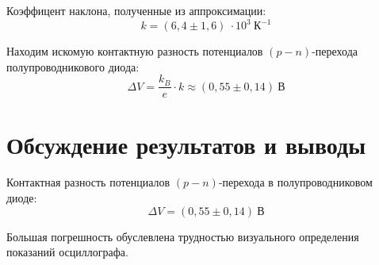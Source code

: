 \documentclass[a4paper, 12pt]{article}
\begin{document}
Коэффицент наклона, полученные из аппроксимации:
\[
    k = (6,4 \pm 1,6)\: \cdot 10^3\: К^{-1}
\]

Находим искомую контактную разность
потенциалов $(p-n)$-перехода полупроводникового диода:
\[
    \Delta V = \frac{k_{B}}{e} \cdot k \approx (0,55 \pm 0,14)\: В 
\]










\section{Обсуждение результатов и выводы}
Контактная разность потенциалов $(p-n)$-перехода в полупроводниковом
диоде:
\[
    \Delta V = (0,55 \pm 0,14)\: В 
\]

Большая погрешность обуслевлена трудностью визуального определения
показаний осциллографа.
\end{document}
